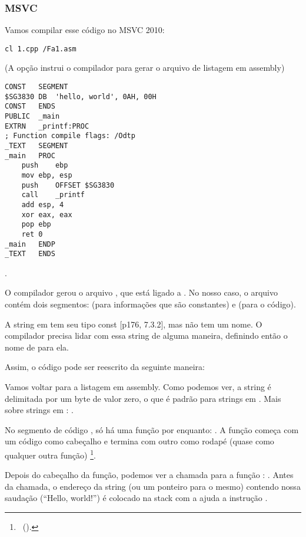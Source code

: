 \subsubsection{MSVC}

Vamos compilar esse código no MSVC 2010:

\begin{lstlisting}
cl 1.cpp /Fa1.asm
\end{lstlisting}

(A opção  instrui o compilador para gerar o arquivo de listagem em assembly)

\begin{lstlisting}[caption=MSVC 2010]
CONST	SEGMENT
$SG3830	DB	'hello, world', 0AH, 00H
CONST	ENDS
PUBLIC	_main
EXTRN	_printf:PROC
; Function compile flags: /Odtp
_TEXT	SEGMENT
_main	PROC
	push	ebp
	mov	ebp, esp
	push	OFFSET $SG3830
	call	_printf
	add	esp, 4
	xor	eax, eax
	pop	ebp
	ret	0
_main	ENDP
_TEXT	ENDS
\end{lstlisting}

\PTBRph{} .

O compilador gerou o arquivo , que está ligado a .
No nosso caso, o arquivo contém dois segmentos:  (para informações que são constantes) e  (para o código).

\label{string_is_const_char}
A string  em \CCpp tem seu tipo const  [\TCPPPL p176, 7.3.2], mas não tem um nome.
O compilador precisa lidar com essa string de alguma maneira, definindo então o nome de  para ela.

Assim, o código pode ser reescrito da seguinte maneira:



Vamos voltar para a listagem em assembly. Como podemos ver, a string é delimitada por um byte de valor zero, o que é padrão para strings em \CCpp.
Mais sobre strings em \CCpp: .

No segmento de código , só há uma função por enquanto: \main{}.
A função \main{} começa com um código como cabeçalho e termina com outro como rodapé (quase como qualquer outra função)
\footnote{\PTBRph{} ~().}.

Depois do cabeçalho da função, podemos ver a chamada para a função \printf{}: .
Antes da chamada, o endereço da string (ou um ponteiro para o mesmo) contendo nossa saudação (``Hello, world!'') é colocado na stack com a ajuda a instrução \PUSH.

